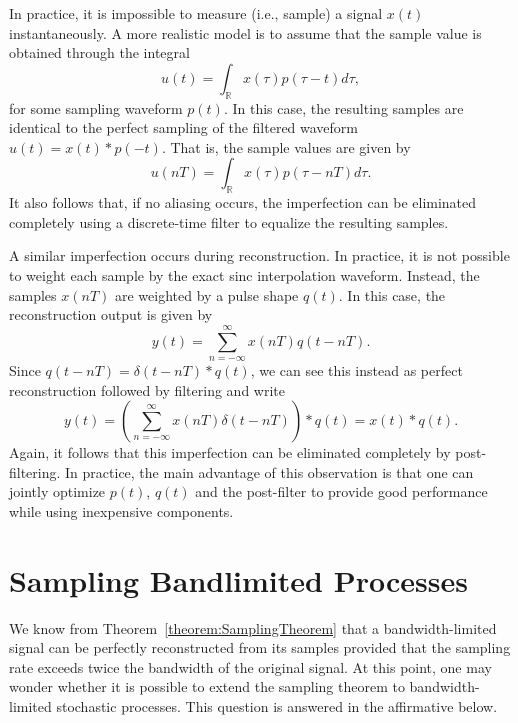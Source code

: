 In practice, it is impossible to measure (i.e., sample) a signal $x(t)$ instantaneously.
A more realistic model is to assume that the sample value is obtained through the integral
\begin{equation*}
u(t) = \int_{\mathbb{R}} x(\tau) p(\tau-t) d\tau ,
\end{equation*}
for some sampling waveform $p(t)$.
In this case, the resulting samples are identical to the perfect sampling of the filtered waveform $u(t)=x(t)*p(-t)$.
That is, the sample values are given by
\begin{equation*}
u(nT) = \int_{\mathbb{R}} x(\tau) p(\tau-nT) d\tau .
\end{equation*}
It also follows that, if no aliasing occurs, the imperfection can be eliminated completely using a discrete-time filter to equalize the resulting samples.

A similar imperfection occurs during reconstruction.
In practice, it is not possible to weight each sample by the exact sinc interpolation waveform.
Instead, the samples $x(nT)$ are weighted by a pulse shape $q(t)$.
In this case, the reconstruction output is given by
\[ y(t) = \sum_{n=-\infty}^{\infty} x(nT) q(t-nT). \]
Since $q(t-nT) = \delta(t-nT) * q(t)$, we can see this instead as perfect reconstruction followed by filtering and write
\[ y(t) = \left( \sum_{n=-\infty}^{\infty} x(nT) \delta (t-nT) \right) * q(t) = x(t) * q(t). \]
Again, it follows that this imperfection can be eliminated completely by post-filtering.
In practice, the main advantage of this observation is that one can jointly optimize $p(t)$, $q(t)$ and the post-filter to provide good performance while using inexpensive components.


\section{Sampling Bandlimited Processes}

We know from Theorem~\ref{theorem:SamplingTheorem} that a bandwidth-limited signal can be perfectly reconstructed from its samples provided that the sampling rate exceeds twice the bandwidth of the original signal.
At this point, one may wonder whether it is possible to extend the sampling theorem to bandwidth-limited stochastic processes.
This question is answered in the affirmative below.

